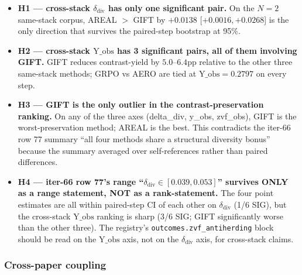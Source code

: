 \documentclass{article}
\begin{document}
\begin{itemize}
\item \textbf{H1 --- cross-stack $\delta_{\mathrm{div}}$ has only one
      significant pair.} On the $N\!=\!2$ same-stack corpus,
      AREAL $>$ GIFT by $+0.0138$ [$+0.0016,+0.0268$] is the only
      direction that survives the paired-step bootstrap at 95\%.
\item \textbf{H2 --- cross-stack $\mathrm{Y\_obs}$ has 3 significant pairs,
      all of them involving GIFT.} GIFT reduces contrast-yield
      by $5.0$--$6.4$pp relative to the other three same-stack methods;
      GRPO vs AERO are tied at $\mathrm{Y\_obs}=0.2797$ on every step.
\item \textbf{H3 --- GIFT is the only outlier in the contrast-preservation
      ranking.} On any of the three axes (delta\_div, y\_obs, zvf\_obs),
      GIFT is the worst-preservation method; AREAL is the best.
      This contradicts the iter-66 row 77 summary ``all four methods
      share a structural diversity bonus'' because the summary
      averaged over self-references rather than paired differences.
\item \textbf{H4 --- iter-66 row 77's range ``$\delta_{\mathrm{div}}
      \in [0.039, 0.053]$'' survives ONLY as a range statement, NOT as
      a rank-statement.} The four point estimates are all within
      paired-step CI of each other on $\delta_{\mathrm{div}}$
      (1/6 SIG), but the cross-stack
      $\mathrm{Y\_obs}$ ranking is sharp (3/6 SIG; GIFT significantly
      worse than the other three). The registry's
      \texttt{outcomes.zvf\_antiherding} block should be read on
      the $\mathrm{Y\_obs}$ axis, not on the $\delta_{\mathrm{div}}$
      axis, for cross-stack claims.
\end{itemize}

\subsubsection{Cross-paper coupling}
\end{document}
